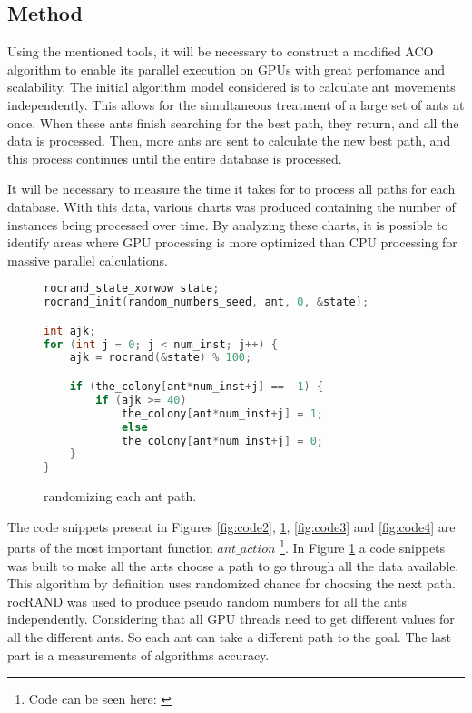 \subsection{Method} \label{Method}

Using the mentioned tools, it will be necessary to construct a modified ACO algorithm to enable its
parallel execution on GPUs with great perfomance and scalability. The initial algorithm model
considered is to calculate ant movements independently. This allows for the simultaneous treatment
of a large set of ants at once. When these ants finish searching for the best path, they return,
and all the data is processed. Then, more ants are sent to calculate the new best path, and this
process continues until the entire database is processed.

It will be necessary to measure the time it takes for to process all paths for each database.
With this data, various charts was produced containing the number of instances being processed
over time. By analyzing these charts, it is possible to identify areas where GPU
processing is more optimized than CPU processing for massive parallel calculations.

\begin{figure}[h!]
\begin{lstlisting}[language=c++]
rocrand_state_xorwow state;
rocrand_init(random_numbers_seed, ant, 0, &state);

int ajk;
for (int j = 0; j < num_inst; j++) {
    ajk = rocrand(&state) % 100;

    if (the_colony[ant*num_inst+j] == -1) {
        if (ajk >= 40)
            the_colony[ant*num_inst+j] = 1;
            else
            the_colony[ant*num_inst+j] = 0;
    }
}
\end{lstlisting}
\caption{randomizing each ant path.}
\label{fig:code1}
\end{figure}

The code snippets present in Figures \ref{fig:code2}, \ref{fig:code1}, \ref{fig:code3} and \ref{fig:code4} are parts of the most important function $ant\_action$ \footnote{Code can be seen here: \cite{santiagoParallelAco}}.
In Figure \ref{fig:code1} a code snippets was built to make all the ants choose a path to go through all the data available.
This algorithm by definition uses randomized chance for choosing the next path.
rocRAND \cite{rocrand} was used to produce pseudo random numbers for all the ants independently.
Considering that all GPU threads need to get different values for all the different ants. So each ant
can take a different path to the goal. The last part is a measurements of algorithms accuracy.

